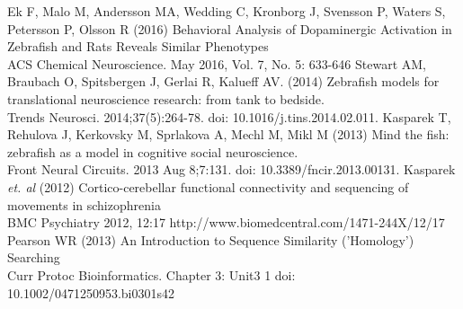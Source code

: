 \documentclass{article}
\begin{document}
\begin{thebibliography}{99} %
Ek F, Malo M, Andersson MA, Wedding C, Kronborg J, Svensson P, Waters S, Petersson P, Olsson R (2016) Behavioral Analysis of Dopaminergic Activation in Zebrafish and Rats Reveals Similar Phenotypes\\
ACS Chemical Neuroscience. May 2016, Vol. 7, No. 5: 633-646
Stewart AM, Braubach O, Spitsbergen J, Gerlai R, Kalueff AV. (2014) Zebrafish models for translational neuroscience research: from tank to bedside.\\
Trends Neurosci. 2014;37(5):264-78. doi: 10.1016/j.tins.2014.02.011.
Kasparek T, Rehulova J, Kerkovsky M, Sprlakova A, Mechl M, Mikl M (2013) Mind the fish: zebrafish as a model in cognitive social neuroscience.\\
Front Neural Circuits. 2013 Aug 8;7:131. doi: 10.3389/fncir.2013.00131.
Kasparek \textit{et. al} (2012) Cortico-cerebellar functional connectivity and sequencing of movements in schizophrenia\\
BMC Psychiatry 2012, 12:17 http://www.biomedcentral.com/1471-244X/12/17
Pearson WR (2013) An Introduction to Sequence Similarity ('Homology') Searching\\
Curr Protoc Bioinformatics. Chapter 3: Unit3 1
doi:  10.1002/0471250953.bi0301s42
\end{thebibliography}
\end{document}
